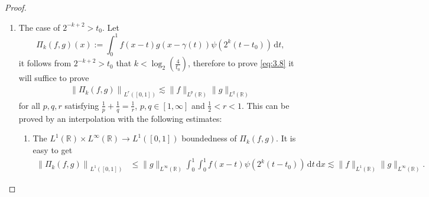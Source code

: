 \documentclass[11pt, twoside, leqno]{article}
\def\gs{\gtrsim}
\theoremstyle{definition}
\numberwithin{equation}{section}
\begin{document}
\begin{proof}
\begin{enumerate}
\begin{enumerate}
  \item[$\circ$] The $L^1(\mathbb{R})\times L^1(\mathbb{R}) \rightarrow L^{\frac{1}{2}}(\mathbb{R})$ boundedness of $\Lambda_N(f_{t_0, N}, g_{t_0, N})$. As in Proposition \ref{proposition 3.1}, we need a $L^1(\mathbb{R})\times L^1(\mathbb{R}) \rightarrow L^{1}(\mathbb{R})$ estimate for $\Lambda_N(f_{t_0, N}, g_{t_0, N})$. By Lagrange's mean value theorem, it follows from the change of variables $u=x-t$ and $v=x-\Upsilon_{t_0}(t)$ that $$\left|{\frac{\partial(u,v)}{\partial(x,t)}}\right|=|1-\Upsilon_{t_0}'(t)|=|\gamma'(t+t_{0})-\gamma'(t_{0})|=|\gamma''(\vartheta)||t|\gs 2^{-k},$$
where $\vartheta \in [{\frac{1}{2}}t_0, {\frac{3}{2}}t_0]$. Then,
  \begin{align*}
\left\|\Lambda_N(f_{t_0, N}, g_{t_0, N})\right\|_{L^{1}(\mathbb{R})}&\lesssim  \int_\mathbb{R}\int_\mathbb{R} f_{t_0, N}(u)g_{t_0, N}(v)\left|{\frac{\partial(x,t)}{\partial(u,v)}}\right|\,\textrm{d}u\textrm{d}v\\ &\lesssim 2^{k} \|f_{t_0, N}\|_{L^{1}(\mathbb{R})}\|g_{t_0, N}\|_{L^{1}(\mathbb{R})}.
\end{align*}
Moreover, one may use the Cauchy-Schwartz inequality to deduce that
  \begin{align*}
\left\|\Lambda_N(f_{t_0, N}, g_{t_0, N})\right\|_{L^{\frac{1}{2}}(\mathbb{R})}\lesssim |\Omega_{N}|\left\|\Lambda_N(f_{t_0, N}, g_{t_0, N})\right\|_{L^{1}(\mathbb{R})} \lesssim \|f_{t_0, N}\|_{L^{1}(\mathbb{R})}\|g_{t_0, N}\|_{L^{1}(\mathbb{R})}.
\end{align*}
\end{enumerate}
Putting things together, it follows from an interpolation that \eqref{eq:3.10} holds for all $p,q,r$ satisfying $\frac{1}{p}+\frac{1}{q}=\frac{1}{r}$, $p, q \in [1, \infty]$ and $\frac{1}{2}<r<1$.

  \item[$\bullet$] The case of $2^{-k+2}> t_0$. Let
  $$\Pi_k(f,g)(x):=\int_{0}^{1}f(x-t)g(x-\gamma(t))\psi\left(2^{k}(t-t_{0})\right)\,\textrm{d}t,$$
  it follows from $2^{-k+2}> t_0$ that $k< \log_2 (\frac{4}{t_0})$, therefore to prove \eqref{eq:3.8} it will suffice to prove
   \begin{align*}
\left\|\Pi_k(f,g)\right\|_{L^{r}([0, 1])}\lesssim \|f\|_{L^{p}(\mathbb{R})}\|g\|_{L^{q}(\mathbb{R})}
\end{align*}
for all $p,q,r$ satisfying $\frac{1}{p}+\frac{1}{q}=\frac{1}{r}$, $p, q \in [1, \infty]$ and $\frac{1}{2}<r<1$. This can be proved by an interpolation with the following estimates:
\begin{enumerate}
  \item[$\circ$] The $L^1(\mathbb{R})\times L^\infty(\mathbb{R}) \rightarrow L^1([0, 1])$ boundedness of $\Pi_k(f,g)$. It is easy to get
\begin{align*}
\left\|\Pi_k(f,g)\right\|_{L^{1}([0, 1])}&\leq \|g\|_{L^{\infty}(\mathbb{R})}\int_{0}^{1}\int_{0}^{1} f(x-t)\psi\left(2^{k}(t-t_{0})\right)\,\textrm{d}t\,\textrm{d}x \lesssim \|f\|_{L^{1}(\mathbb{R})}\|g\|_{L^{\infty}(\mathbb{R})}.
\end{align*}


\end{enumerate}
\end{enumerate}
\end{proof}
\end{document}
